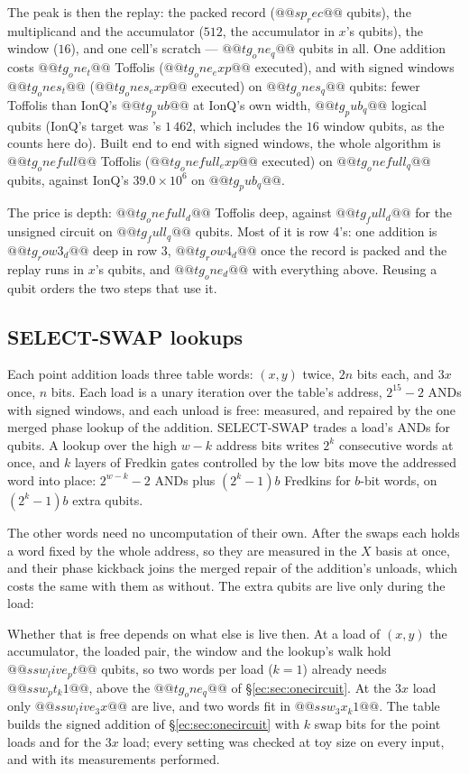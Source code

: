 \noindent
The peak is then the replay: the packed record ($@@sp_rec@@$ qubits), the multiplicand and the
accumulator ($512$, the accumulator in $x$'s qubits), the window ($16$), and one cell's scratch ---
$@@tg_one_q@@$ qubits in all. One addition costs $@@tg_one_t@@$ Toffolis ($@@tg_one_exp@@$ executed),
and with signed windows $@@tg_ones_t@@$ ($@@tg_ones_exp@@$ executed) on $@@tg_ones_q@@$ qubits: fewer
Toffolis than IonQ's $@@tg_pub@@$ at IonQ's own width, $@@tg_pub_q@@$ logical qubits (IonQ's target
was \cite{ec:schrott26}'s $1\,462$, which includes the $16$ window qubits, as the counts here do). Built end to end with
signed windows, the whole algorithm is $@@tg_onefull@@$ Toffolis ($@@tg_onefull_exp@@$ executed) on
$@@tg_onefull_q@@$ qubits, against IonQ's $39.0\times10^6$ on $@@tg_pub_q@@$.

The price is depth: $@@tg_onefull_d@@$ Toffolis deep, against $@@tg_full_d@@$ for the unsigned circuit
on $@@tg_full_q@@$ qubits. Most of it is row 4's: one addition is $@@tg_row3_d@@$ deep in row 3,
$@@tg_row4_d@@$ once the record is packed and the replay runs in $x$'s qubits, and $@@tg_one_d@@$ with
everything above. Reusing a qubit orders the two steps that use it.

\subsection{SELECT-SWAP lookups}\label{ec:sec:ssw}

Each point addition loads three table words: $(x,y)$ twice, $2n$ bits each, and $3x$ once, $n$ bits.
Each load is a unary iteration over the table's address, $2^{15}-2$ ANDs with signed windows, and
each unload is free: measured, and repaired by the one merged phase lookup of the addition.
SELECT-SWAP \cite{ec:lks18} trades a load's ANDs for qubits. A lookup over the high $w-k$ address
bits writes $2^k$ consecutive words at once, and $k$ layers of Fredkin gates controlled by the low
bits move the addressed word into place: $2^{w-k}-2$ ANDs plus $(2^k-1)b$ Fredkins for $b$-bit
words, on $(2^k-1)b$ extra qubits.

The other words need no uncomputation of their own. After the swaps each holds a word fixed by the
whole address, so they are measured in the $X$ basis at once, and their phase kickback joins the
merged repair of the addition's unloads, which costs the same with them as without. The extra
qubits are live only during the load:

Whether that is free depends on what else is live then. At a load of $(x,y)$ the accumulator, the
loaded pair, the window and the lookup's walk hold $@@ssw_live_pt@@$ qubits, so two words per load
($k=1$) already needs $@@ssw_pt_k1@@$, above the $@@tg_one_q@@$ of \S\ref{ec:sec:onecircuit}. At the
$3x$ load only $@@ssw_live_3x@@$ are live, and two words fit in $@@ssw_3x_k1@@$. The table builds the
signed addition of \S\ref{ec:sec:onecircuit} with $k$ swap bits for the point loads and for the $3x$
load; every setting was checked at toy size on every input, and with its measurements performed.


